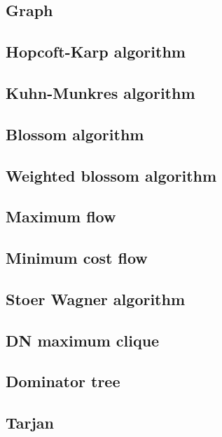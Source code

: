 \documentclass[titlepage, a4paper,10pt]{article}
\begin{document}
\begin{multicols}{2}
\begin{spacing}{0.6}
{		\section{Graph}
				
			\subsection{Hopcoft-Karp algorithm}
				
			\subsection{Kuhn-Munkres algorithm}
				
			\subsection{Blossom algorithm}
				
			\subsection{Weighted blossom algorithm}
				
			\subsection{Maximum flow}
				
			\subsection{Minimum cost flow}
				
			\subsection{Stoer Wagner algorithm}
				
			\subsection{DN maximum clique}
				
			\subsection{Dominator tree}
				
			\subsection{Tarjan}
				
}
\end{spacing}
\end{multicols}
\end{document}
